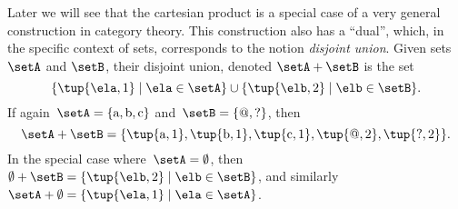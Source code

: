 Later we will see that the cartesian product is a special case of a very general construction in category theory. This construction also has a ``dual'', which, in the specific context of sets, corresponds to the notion \emph{disjoint union}. Given sets $\setA$ and $\setB$, their disjoint union, denoted $\setA + \setB$ is the set
\begin{equation*}
\{ \tup{\ela, 1} \mid \ela \in \setA \} \cup \{ \tup{\elb, 2} \mid \elb \in \setB \}.
\end{equation*}
If again~$\setA = \{ \text{a}, \text{b}, \text{c} \} $ and~$\setB = \{ @, ? \}$, then
\begin{equation*}
\setA + \setB = \{ \tup{\text{a}, 1}, \tup{\text{b}, 1}, \tup{\text{c}, 1}, \tup{@, 2},  \tup{?, 2}\}.
\end{equation*}
In the special case where~$\setA = \emptyset$, then~$\emptyset + \setB = \{ \tup{\elb,2} \mid \elb \in \setB \}$, and similarly~$\setA + \emptyset =  \{ \tup{\ela,1} \mid \ela \in \setA \}$.



\clearpage
